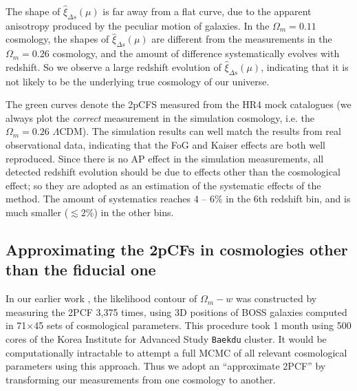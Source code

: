 \documentclass[iop]{emulateapj}
\begin{document}
The shape of $\hat \xi_{\Delta s}(\mu)$ is far away from a flat curve, 
due to the apparent anisotropy produced by the peculiar motion of galaxies.
In the $\Omega_m=0.11$ cosmology, 
the shapes of $\hat\xi_{\Delta s}(\mu)$ are different from the measurements in the $\Omega_m=0.26$ cosmology,
and the amount of difference systematically evolves with redshift.
So we observe a large redshift evolution of $\hat\xi_{\Delta s}(\mu)$, 
indicating that it is not likely to be the underlying true cosmology of our universe.

The green curves denote the 2pCFS measured from the HR4 mock catalogues
(we always plot the {\it correct} measurement in the simulation cosmology, i.e. the $\Omega_m=0.26$ $\Lambda$CDM).
The simulation results can well match the results from real observational data,
indicating that the FoG \citep{FOG} and Kaiser \citep{Kaiser1987} effects are both well reproduced.
Since there is no AP effect in the simulation measurements,
all detected redshift evolution should be due to effects other than the cosmological effect; 
so they are adopted as an estimation of the systematic effects of the method.
The amount of systematics reaches 4 -- 6\% in the 6th redshift bin,
and is much smaller ($\lesssim2\%$) in the other bins.



\subsection{Approximating the 2pCFs in cosmologies other than the fiducial one}\label{sec:approx_2pcf}

In our earlier work \citep{Li2016}, the likelihood contour of $\Omega_m - w$ was constructed by
measuring the 2PCF 3,375 times,
using 3D positions of BOSS galaxies computed in 71$\times$45 sets of cosmological parameters.
This procedure took 1 month using 500 cores of the Korea Institute for Advanced Study {\texttt {Baekdu}} cluster.
It would be computationally intractable to attempt a full MCMC of all relevant cosmological parameters using this approach. 
Thus we adopt an ``approximate 2PCF'' by transforming our measurements from one cosmology to another.
\end{document}
